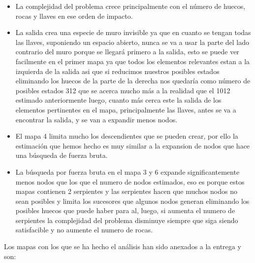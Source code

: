\documentclass[11pt,spanish]{article}
\begin{document}
			\begin{itemize}
				\item La complejidad del problema crece principalmente con el número de huecos, rocas y llaves en ese orden de impacto.
				\item La salida crea una especie de muro invisible ya que en cuanto se tengan todas las llaves, suponiendo un espacio abierto, nunca se va a usar la parte del lado contrario del muro porque se llegará primero a la salida, esto se puede ver facilmente en el primer mapa ya que todos los elementos relevantes estan a la izquierda de la salida asi que si reducimos nuestros posibles estados eliminando los huecos de la parte de la derecha nos quedaría como número de posibles estados 312 que se acerca mucho más a la realidad que el 1012 estimado anteriormente luego, cuanto más cerca este la salida de los elementos pertinentes en el mapa, principalmente las llaves, antes se va a encontrar la salida, y se van a expandir menos nodos.
				\item El mapa 4 limita mucho los descendientes que se pueden crear, por ello la estimación que hemos hecho es muy similar a la expansion de nodos que hace una búsqueda de fuerza bruta.
				\item La búsqueda por fuerza bruta en el mapa 3 y 6 expande significantemente menos nodos que los que el numero de nodos estimados, eso es porque estos mapas contienen 2 serpientes y las serpientes hacen que muchos nodos no sean posibles y limita los sucesores que algunos nodos generan eliminando los posibles huecos que puede haber para al, luego, si aumenta el numero de serpientes la complejidad del problema disminuye siempre que siga siendo satisfacible y no aumente el numero de rocas.
			\end{itemize}
			Los mapas con los que se ha hecho el análisis han sido anexados a la entrega y son:\\
\end{document}
